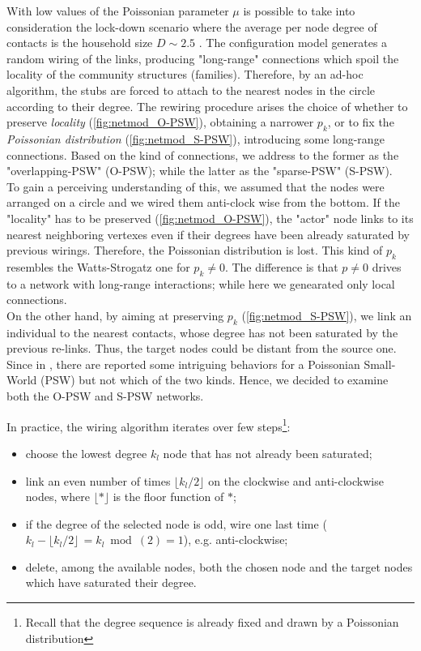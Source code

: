 \documentclass[a4paper,10pt,twoside]{book} %
\theoremstyle{definition}
\begin{document}
With low values of the Poissonian parameter $\mu$ is possible to take into consideration the lock-down scenario where the average per node degree of contacts is the household size $D \sim 2.5$ \cite{Thurner::NetBasedExpl}. The configuration model generates a random wiring of the links, producing "long-range" connections which spoil the locality of the community structures (families). Therefore, by an ad-hoc algorithm, the stubs are forced to attach to the nearest nodes in the circle according to their degree. 
The rewiring procedure arises the choice of whether to preserve \textit{locality}  (\autoref{fig:netmod_O-PSW}), obtaining a narrower $p_k$, or to fix the \textit{Poissonian distribution} (\autoref{fig:netmod_S-PSW}), introducing some long-range connections. Based on the kind of connections, we address to the former as the "overlapping-PSW" (O-PSW); while the latter as the "sparse-PSW" (S-PSW). \\
To gain a perceiving understanding of this, we assumed that the nodes were arranged on a circle and we wired them anti-clock wise from the bottom. If the "locality" has to be preserved (\autoref{fig:netmod_O-PSW}), the "actor" node links to its nearest neighboring vertexes even if their degrees have been already saturated by previous wirings. Therefore, the Poissonian distribution is lost. This kind of $ p_k$ resembles the Watts-Strogatz one for $ p_k \neq 0$. The difference is that $ p \neq 0$ drives to a network with long-range interactions; while here we genearated only local connections.\\
On the other hand, by aiming at preserving $p_k$ (\autoref{fig:netmod_S-PSW}), we link an individual to the nearest contacts, whose degree has not been saturated by the previous re-links. Thus, the target nodes could be distant from the source one. Since in \cite{Thurner::Appendix_NetBasedExpl}, there are reported some intriguing behaviors for a Poissonian Small-World (PSW) but not which of the two kinds. Hence, we decided to examine both the O-PSW and S-PSW networks.

In practice, the wiring algorithm iterates over few steps\footnote{Recall that the degree sequence is already fixed and drawn by a Poissonian distribution}:
\begin{itemize}
	\item choose the lowest degree $k_l$ node that has not already been saturated;
	\item link an even number of times $\lfloor k_l /2 \rfloor$ on the clockwise and anti-clockwise nodes, where $\lfloor * \rfloor$ is the floor function of $*$;
	\item if the degree of the selected node is odd, wire one last time ($k_l - \lfloor k_l /2 \rfloor \, = k_l \bmod(2) =  1$), e.g. anti-clockwise;
	\item delete, among the available nodes, both the chosen node and the target nodes which have saturated their degree.
\end{itemize}
\end{document}
